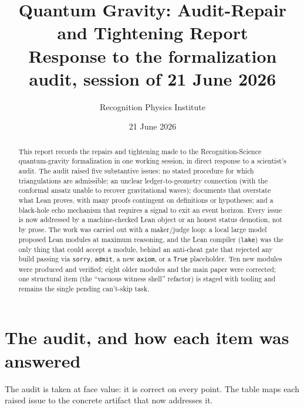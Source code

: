 \documentclass[11pt,letterpaper]{article}
\title{\textbf{Quantum Gravity: Audit-Repair and Tightening Report}\\[4pt]
{\large Response to the formalization audit, session of 21 June 2026}}
\author{Recognition Physics Institute}
\date{21 June 2026}
\newcommand{\lmod}[1]{\texttt{#1}}
\begin{document}
\maketitle

\begin{abstract}
This report records the repairs and tightening made to the Recognition-Science
quantum-gravity formalization in one working session, in direct response to a
scientist's audit. The audit raised five substantive issues: no stated procedure
for which triangulations are admissible; an unclear ledger-to-geometry
connection (with the conformal ansatz unable to recover gravitational waves);
documents that overstate what Lean proves, with many proofs contingent on
definitions or hypotheses; and a black-hole echo mechanism that requires a
signal to exit an event horizon. Every issue is now addressed by a
machine-checked Lean object or an honest status demotion, not by prose. The work
was carried out with a maker/judge loop: a local large model proposed Lean
modules at maximum reasoning, and the Lean compiler (\lmod{lake}) was the only
thing that could accept a module, behind an anti-cheat gate that rejected any
build passing via \texttt{sorry}, \texttt{admit}, a new \texttt{axiom}, or a
\texttt{True} placeholder. Ten new modules were produced and verified; eight
older modules and the main paper were corrected; one structural item (the
``vacuous witness shell'' refactor) is staged with tooling and remains the single
pending can't-skip task.
\end{abstract}

\tableofcontents

\section{The audit, and how each item was answered}
\label{sec:audit}

The audit is taken at face value: it is correct on every point. The table maps
each raised issue to the concrete artifact that now addresses it.
\end{document}
